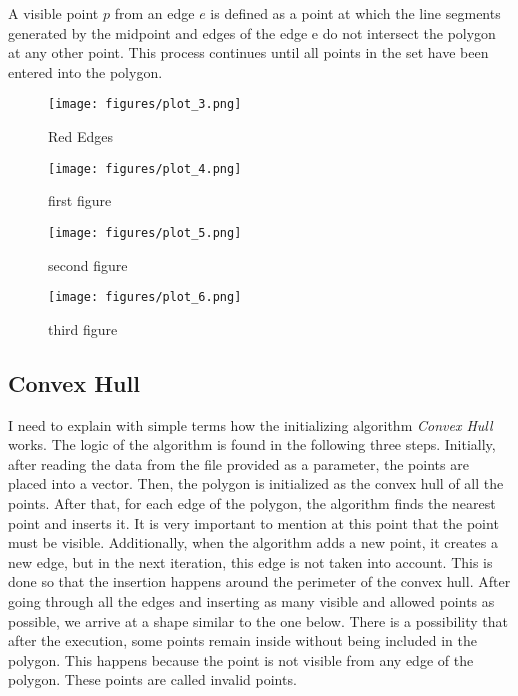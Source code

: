 \documentclass[12pt]{article}
\begin{document}
    A visible point $p$ from an edge $e$ is defined as a point at which the line segments generated by the midpoint and edges of the edge e do not intersect the polygon at any other point. This process continues until all points in the set have been entered into the polygon.

\begin{figure}
    \centering
    \begin{minipage}{0.49\textwidth}
        \centering
        \texttt{[image: figures/plot\_3.png]} %
        \caption{Red Edges}
        \label{fig:red_edge}
    \end{minipage}
    \begin{minipage}{0.49\textwidth}
        \centering
        \texttt{[image: figures/plot\_4.png]} %
        \caption{first figure}
    \end{minipage}\hfill
    \begin{minipage}{0.49\textwidth}
        \centering
        \texttt{[image: figures/plot\_5.png]} %
        \caption{second figure}
    \end{minipage}
    \begin{minipage}{0.49\textwidth}
        \centering
        \texttt{[image: figures/plot\_6.png]} %
        \caption{third figure}
    \end{minipage}
\end{figure}


    \subsection{Convex Hull}
    I need to explain with simple terms how the initializing algorithm \emph{Convex Hull} works. The logic of the algorithm is found in the following three steps. Initially, after reading the data from the file provided as a parameter, the points are placed into a vector. Then, the polygon is initialized as the convex hull of all the points. After that, for each edge of the polygon, the algorithm finds the nearest point and inserts it. It is very important to mention at this point that the point must be visible. Additionally, when the algorithm adds a new point, it creates a new edge, but in the next iteration, this edge is not taken into account. This is done so that the insertion happens around the perimeter of the convex hull. After going through all the edges and inserting as many visible and allowed points as possible, we arrive at a shape similar to the one below. There is a possibility that after the execution, some points remain inside without being included in the polygon. This happens because the point is not visible from any edge of the polygon. These points are called invalid points.
    
\end{document}
